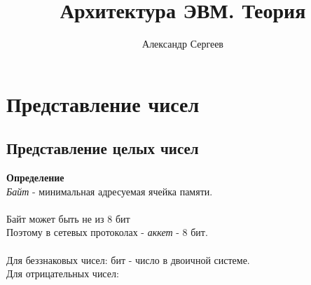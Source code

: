 \documentclass[12pt]{article}
\title{Архитектура ЭВМ. Теория}
\author{Александр Сергеев}
\date{}
\begin{document}
\maketitle
\section{Представление чисел}
\subsection{Представление целых чисел}
\textbf{Определение}\\
\textit{Байт} - минимальная адресуемая ячейка памяти.\\\\
Байт может быть не из 8 бит\\
Поэтому в сетевых протоколах - \textit{аккет} - 8 бит.\\\\
Для беззнаковых чисел: бит - число в двоичной системе.\\
Для отрицательных чисел: \\
\end{document}
